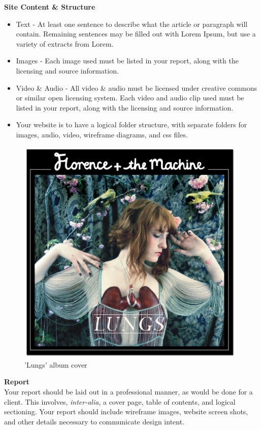 \textbf{Site Content \& Structure}

\begin{itemize}
	\item Text - At least one sentence to describe what the article or paragraph will contain.  Remaining sentences may be filled out with Lorem Ipsum, but use a variety of extracts from Lorem.
	\item Images - Each image used must be listed in your report, along with the licensing and source information.   
	\item Video \& Audio - All video \& audio must be licensed under creative commons or similar open licensing system.  Each video and audio clip used must be listed in your report, along with the licensing and source information.
	\item Your website is to have a logical folder structure, with separate folders for images, audio, video, wireframe diagrams, and css files. 
\end{itemize}


\vspace{1cm}
\begin{figure}[h!t]
	\centering
	\includegraphics[width = 11cm]{img/lungs.jpg}
	\caption{'Lungs' album cover}
	\label{fig:nikonf3}
\end{figure}

\textbf{Report}\\
Your report should be laid out in a professional manner, as would be done for a client.  This involves, \emph{inter-alia}, a cover page, table of contents, and logical sectioning.  Your report should include wireframe images, website screen shots, and other details necessary to communicate design intent.
\vspace{1cm}

